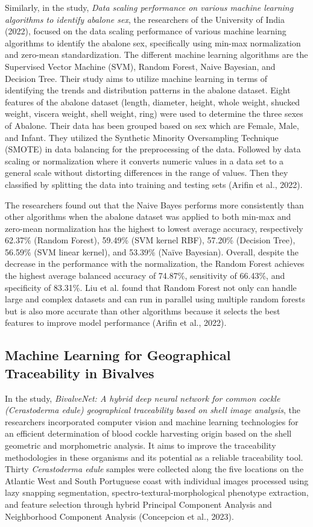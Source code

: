 Similarly, in the study, \textit{Data scaling performance on various machine learning algorithms to identify abalone sex}, the researchers of the University of India (2022), focused on the data scaling performance of various machine learning algorithms to identify the abalone sex, specifically using min-max normalization and zero-mean standardization. The different machine learning algorithms are the Supervised Vector Machine (SVM), Random Forest, Naive Bayesian, and Decision Tree. Their study aims to utilize machine learning in terms of identifying the trends and distribution patterns in the abalone dataset. Eight features of the abalone dataset (length, diameter, height, whole weight, shucked weight, viscera weight, shell weight, ring) were used to determine the three sexes of Abalone. Their data has been grouped based on sex which are Female, Male, and Infant. They utilized the Synthetic Minority Oversampling Technique (SMOTE) in data balancing for the preprocessing of the data. Followed by data scaling or normalization where it converts numeric values in a data set to a general scale without distorting differences in the range of values. Then they classified by splitting the data into training and testing sets (Arifin et al., 2022). 

The researchers found out that the Naive Bayes performs more consistently than other algorithms when the abalone dataset was applied to both min-max and zero-mean normalization has the highest to lowest average accuracy, respectively 62.37\% (Random Forest), 59.49\% (SVM kernel RBF), 57.20\% (Decision Tree), 56.59\% (SVM linear kernel), and 53.39\% (Naïve Bayesian). Overall, despite the decrease in the performance with the normalization, the Random Forest achieves the highest average balanced accuracy of 74.87\%, sensitivity of 66.43\%, and specificity of 83.31\%. Liu et al. found that Random Forest not only can handle large and complex datasets and can run in parallel using multiple random forests but is also more accurate than other algorithms because it selects the best features to improve model performance (Arifin et al., 2022). 

\subsection{Machine Learning for Geographical Traceability in Bivalves}
In the study, \textit{BivalveNet: A hybrid deep neural network for common cockle (Cerastoderma edule) geographical traceability based on shell image analysis}, the researchers incorporated computer vision and machine learning technologies for an efficient determination of blood cockle harvesting origin based on the shell geometric and morphometric analysis. It aims to improve the traceability methodologies in these organisms and its potential as a reliable traceability tool. Thirty \textit{Cerastoderma edule} samples were collected along the five locations on the Atlantic West and South Portuguese coast with individual images processed using lazy snapping segmentation, spectro-textural-morphological phenotype extraction, and feature selection through hybrid Principal Component Analysis and Neighborhood Component Analysis (Concepcion et al., 2023). 

